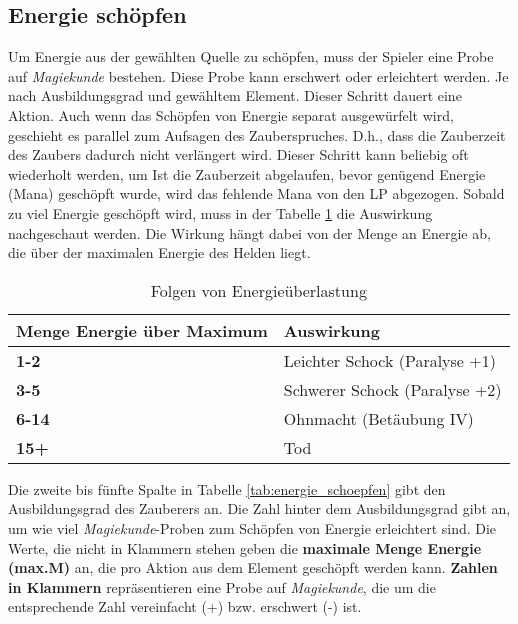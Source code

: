 \subsection{Energie schöpfen}
\label{chap:energie_schoepfen}
Um Energie aus der gewählten Quelle zu schöpfen, muss der Spieler eine Probe auf \textit{Magiekunde} bestehen. Diese Probe kann erschwert oder erleichtert werden. Je nach Ausbildungsgrad und gewähltem Element. Dieser Schritt dauert eine Aktion. Auch wenn das Schöpfen von Energie separat ausgewürfelt wird, geschieht es parallel zum Aufsagen des Zauberspruches. D.h., dass die Zauberzeit des Zaubers dadurch nicht verlängert wird. Dieser Schritt kann beliebig oft wiederholt werden, um  Ist die Zauberzeit abgelaufen, bevor genügend Energie (Mana) geschöpft wurde, wird das fehlende Mana von den LP abgezogen. Sobald zu viel Energie geschöpft wird, muss in der Tabelle \ref{tab:energieueberlastung} die Auswirkung nachgeschaut werden. Die Wirkung hängt dabei von der Menge an Energie ab, die über der maximalen Energie des Helden liegt.

\begin{table}[H]
\begin{center}
\begin{tabular}{|l|l|}
\hline
\textbf{Menge Energie über Maximum} & \textbf{Auswirkung} \\ \hline
\textbf{1-2} & Leichter Schock (Paralyse +1) \\ \hline
\textbf{3-5} & Schwerer Schock (Paralyse +2) \\ \hline
\textbf{6-14} & Ohnmacht (Betäubung IV) \\ \hline
\textbf{15+} & Tod \\ \hline

\end{tabular}
\end{center}
\caption{Folgen von Energieüberlastung}
\label{tab:energieueberlastung}
\end{table}

Die zweite bis fünfte Spalte in Tabelle \ref{tab:energie_schoepfen} gibt den Ausbildungsgrad des Zauberers an. Die Zahl hinter dem Ausbildungsgrad gibt an, um wie viel \textit{Magiekunde}-Proben zum Schöpfen von Energie erleichtert sind. Die Werte, die nicht in Klammern stehen geben die \textbf{maximale Menge Energie (max.M)} an, die pro Aktion aus dem Element geschöpft werden kann. \textbf{Zahlen in Klammern} repräsentieren eine Probe auf \textit{Magiekunde}, die um die entsprechende Zahl vereinfacht (+) bzw. erschwert (-) ist. 

